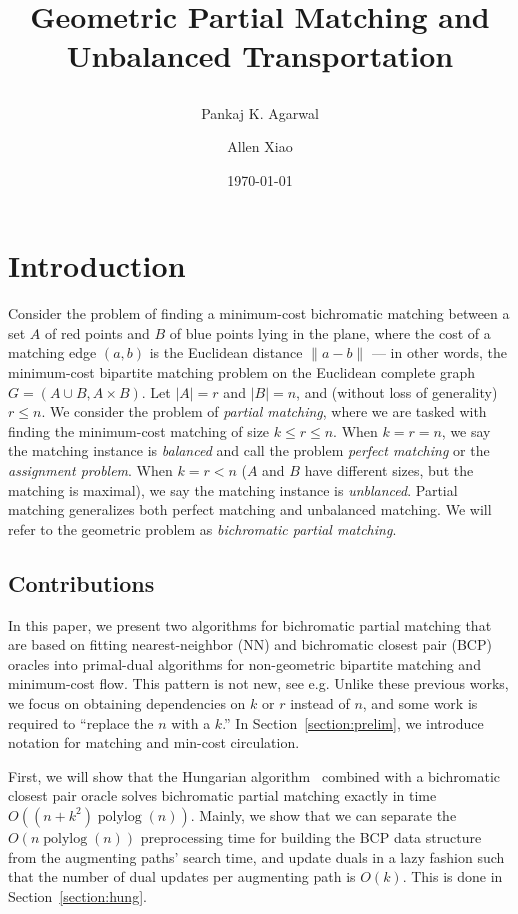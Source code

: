 \documentclass[11pt]{article}
\title{ Geometric Partial Matching and Unbalanced Transportation %
\date{\today} %
\author{
Pankaj K. Agarwal 
\and
Allen Xiao
}
}
\def\polylog{\mathop{\mathrm{polylog}}}
\theoremstyle{plain}
\begin{document}
\maketitle

\section{Introduction}

Consider the problem of finding a minimum-cost bichromatic matching between
a set $A$ of red points and $B$ of blue points lying in the plane,
where the cost of a matching edge $(a, b)$ is the Euclidean distance 
$\|a - b\|$ ---
in other words, the minimum-cost bipartite matching problem on the Euclidean 
complete graph $G = (A \cup B, A \times B)$.
Let $|A| = r$ and $|B| = n$, and (without loss of generality) $r \leq n$.
We consider the problem of \emph{partial matching}, where we are tasked with
finding the minimum-cost matching of size $k \leq r \leq n$.
When $k = r = n$, we say the matching instance is \emph{balanced}
and call the problem \emph{perfect matching} or the \emph{assignment problem}.
When $k = r < n$ ($A$ and $B$ have different sizes, but the matching is 
maximal), we say the matching instance is \emph{unblanced}.
Partial matching generalizes both perfect matching and unbalanced matching.
We will refer to the geometric problem as \emph{bichromatic partial matching}.



\subsection{Contributions}

In this paper, we present two algorithms for bichromatic partial matching
that are based on fitting nearest-neighbor (NN) and bichromatic closest pair 
(BCP) oracles into primal-dual algorithms for non-geometric bipartite matching 
and minimum-cost flow.
This pattern is not new, see e.g. %
Unlike these previous works, we focus on obtaining dependencies on $k$ or $r$ 
instead of $n$, and some work is required to ``replace the $n$ with a $k$.''
In Section~\ref{section:prelim}, we introduce notation for matching and 
min-cost circulation.


First, we will show that the Hungarian algorithm~\cite{kuhn1955hungarian} 
combined with a bichromatic closest pair oracle solves bichromatic partial 
matching exactly in time $O((n + k^2)\polylog(n))$.
Mainly, we show that we can separate the $O(n\polylog(n))$ preprocessing time 
for building the BCP data structure from the augmenting paths' search time,
and update duals in a lazy fashion such that the number of dual updates per
augmenting path is $O(k)$.
This is done in Section~\ref{section:hung}.
\end{document}
